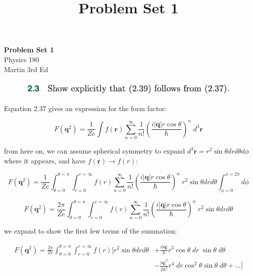 \documentclass[11pt]{article}
\theoremstyle{definition}
\begin{document}
\setcounter{section}{2}
\title{Problem Set 1}


\begin{center}
{\LARGE \bf Problem Set 1}\\
{\large Physics 180}\\
Martin 3rd Ed
\end{center}

\begin{figure}[h!]
    \centering
    \includegraphics[scale = 0.5]{2.3.png}
\end{figure}

Equation 2.37 gives an expression for the form factor:

\begin{equation*}
    F(\mathbf{q}^2) = \frac{1}{Ze}\int f(\mathbf{r})\sum_{n=0}^{\infty} \frac{1}{n!} \left(\frac{i|\mathbf{q}|r\cos\theta}{\hbar}\right)^n \; d^3\mathbf{r} \tag{2.37}
\end{equation*}

from here on, we can assume spherical symmetry to expand $d^3\mathbf{r} = r^2 \sin\theta dr d\theta d\phi$ where it appears, and have $f(\mathbf{r}) \rightarrow f(r)$:

\begin{equation*}
    F(\mathbf{q}^2) = \frac{1}{Ze}\int_{\theta=0}^{\theta=\pi}\int_{r=0}^{r=\infty} f(r)\sum_{n=0}^{\infty} \frac{1}{n!} \left(\frac{i|\mathbf{q}|r\cos\theta}{\hbar}\right)^n \; r^2 \sin\theta dr d\theta  \int_{\phi=0}^{\phi=2\pi} d\phi \tag{2.37.1}
\end{equation*}

\begin{equation*}
    F(\mathbf{q}^2) = \frac{2\pi}{Ze}\int_{\theta=0}^{\theta=\pi}\int_{r=0}^{r=\infty} f(r)\sum_{n=0}^{\infty} \frac{1}{n!} \left(\frac{i|\mathbf{q}|r\cos\theta}{\hbar}\right)^n \; r^2 \sin\theta dr d\theta\tag{2.37.2}
\end{equation*}

we expand to show the first few terms of the summation:

\begin{align*}
    F(\mathbf{q}^2) = \frac{2\pi}{Ze}\int_{\theta=0}^{\theta=\pi}\int_{r=0}^{r=\infty} f(r)
    \biggl[r^2 \sin\theta dr d\theta&+
        \frac{i|\mathbf{q}|}{\hbar}r^3\cos\theta\; dr \; \sin\theta \; d\theta
        \\
        &-
        \frac{|\mathbf{q}|^2}{2\hbar^2} r^4\; dr  \cos^2\theta\sin\theta \;  d\theta
        + \dots \biggr]  \tag{2.37.3}
\end{align*}
\end{document}

